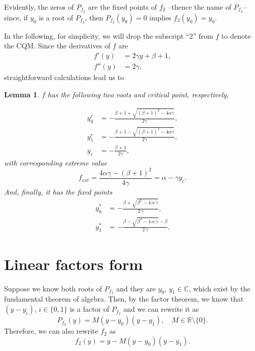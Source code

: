 \documentclass[10pt,twoside,titlepage]{book}
\numberwithin{equation}{chapter}
\numberwithin{figure}{chapter}
\numberwithin{table}{chapter}
\theoremstyle{plain}%
\newtheorem{lem}[thm]{Lemma}
\theoremstyle{definition}
\theoremstyle{remark}
\begin{document}
Evidently, the zeros of $P_{f_2}$ are the fixed points of $f_2$ --thence the name of $P_{f_2}$-- since, if $y_0$ is a root of $P_{f_2}$, then $P_{f_2}(y_0)=0$ implies $f_2(y_0)=y_0$.

In the following, for simplicity, we will drop the subscript ``2'' from $f$ to denote the CQM. Since the derivatives of $f$ are
\begin{equation}
	\begin{aligned}
		f'(y) &=  2\gamma y + \beta + 1, \\
		f''(y) &= 2\gamma,
	\end{aligned}
\end{equation}
straightforward calculations lead us to
\begin{lem}
	$f$ has the following two roots and critical point, respectively,
	
	\begin{equation}
		\begin{aligned}
			y_0^r &= -\frac{\beta+1+\sqrt{(\beta+1)^2-4\alpha\gamma}}{2\gamma},\\
			y_1^r &= -\frac{\beta+1-\sqrt{(\beta+1)^2-4\alpha\gamma}}{2\gamma},\\
			y_c &= -\frac{\beta+1}{2\gamma},
		\end{aligned}
	\end{equation}
	with corresponding extreme value
	\[f_{ext}=\frac{4\alpha\gamma-(\beta+1)^2}{4\gamma}=\alpha-\gamma y_c.\]
	And, finally, it has the fixed points
	\begin{equation}
		\begin{aligned}
			y_0^* &= -\frac{\beta+\sqrt{{\beta}^{2}-4\,\alpha\,\gamma}}{2\,\gamma},\\
			y_1^* &= -\frac{\beta-\sqrt{{\beta}^{2}-4\,\alpha\,\gamma}-\beta}{2\,\gamma}.
		\end{aligned}
	\end{equation}
\end{lem}

\section{Linear factors form}
\label{sub:LinearFactorsForm}

Suppose we know both roots of $P_{f_2}$ and they are $y_0,\,y_1\in\mathbb{C}$, which exist by the fundamental theorem of algebra. Then, by the factor theorem, we know that $(y-y_i),\,i\in\{0,1\}$ is a factor of $P_{f_2}$ and we can rewrite it as
\begin{equation}
	P_{f_2}(y)=M(y-y_0)(y-y_1),\quad M\in\mathbb{R}\setminus\{0\}.
\end{equation}
Therefore, we can also rewrite $f_2$ as
\begin{equation}
	f_2(y)=y-M(y-y_0)(y-y_1).
\end{equation}
\end{document}

